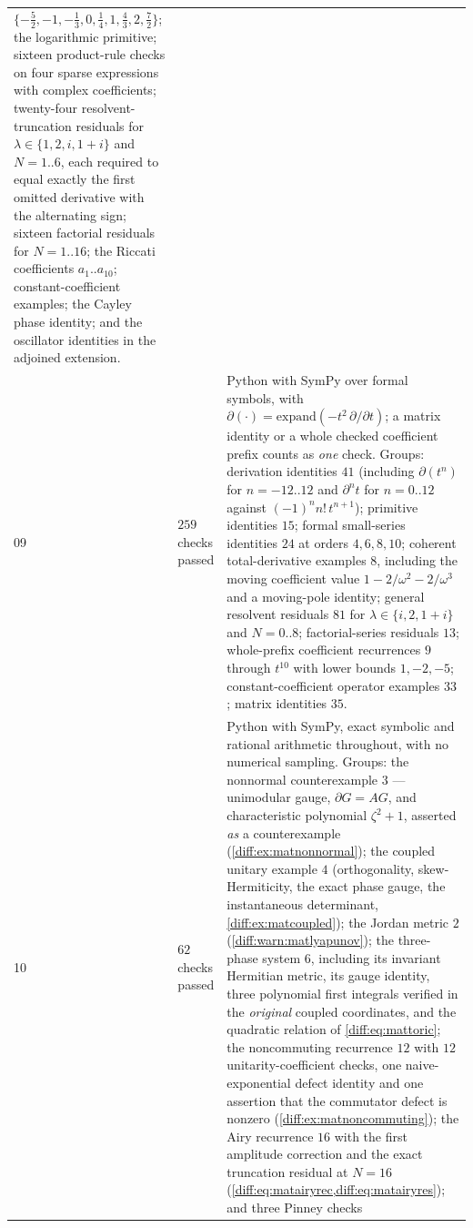 \documentclass[11pt,letterpaper]{article}
\numberwithin{equation}{section}
\theoremstyle{definition}
\theoremstyle{remark}
\newcommand{\der}{\partial}
\begin{document}
\begin{longtable}{@{}L{0.09\textwidth}L{0.13\textwidth}L{0.70\textwidth}@{}}
$\{-\tfrac52,-1,-\tfrac13,0,\tfrac14,1,\tfrac43,2,\tfrac72\}$; the
logarithmic primitive; sixteen product-rule checks on four sparse
expressions with complex coefficients; twenty-four resolvent-truncation
residuals for $\lambda\in\{1,2,i,1+i\}$ and $N=1..6$, each required to equal
exactly the first omitted derivative with the alternating sign; sixteen
factorial residuals for $N=1..16$; the Riccati coefficients $a_{1}..a_{10}$;
constant-coefficient examples; the Cayley phase identity; and the oscillator
identities in the adjoined extension. \\[0.3em]
09 & $259$ checks passed &
Python with SymPy over formal symbols, with
$\der(\cdot)=\mathrm{expand}(-t^{2}\,\partial/\partial t)$; a matrix identity
or a whole checked coefficient prefix counts as \emph{one} check. Groups:
derivation identities $41$ (including $\der(t^{n})$ for $n=-12..12$ and
$\der^{n}t$ for $n=0..12$ against $(-1)^{n}n!\,t^{n+1}$); primitive
identities $15$; formal small-series identities $24$ at orders
$4,6,8,10$; coherent total-derivative examples $8$, including the moving
coefficient value $1-2/\omega^{2}-2/\omega^{3}$ and a moving-pole identity;
general resolvent residuals $81$ for $\lambda\in\{i,2,1+i\}$ and $N=0..8$;
factorial-series residuals $13$; whole-prefix coefficient recurrences $9$
through $t^{10}$ with lower bounds $1,-2,-5$; constant-coefficient operator
examples $33$; matrix identities $35$. \\[0.3em]
10 & $62$ checks passed &
Python with SymPy, exact symbolic and rational arithmetic throughout, with no
numerical sampling. Groups: the nonnormal counterexample $3$ --- unimodular
gauge, $\der G=AG$, and characteristic polynomial $\zeta^{2}+1$, asserted
\emph{as} a counterexample (\cref{diff:ex:matnonnormal}); the coupled unitary
example $4$ (orthogonality, skew-Hermiticity, the exact phase gauge, the
instantaneous determinant, \cref{diff:ex:matcoupled}); the Jordan metric $2$
(\cref{diff:warn:matlyapunov}); the three-phase system $6$, including its
invariant Hermitian metric, its gauge identity, three polynomial first
integrals verified in the \emph{original} coupled coordinates, and the
quadratic relation of \cref{diff:eq:mattoric}; the noncommuting recurrence
$12$ with $12$ unitarity-coefficient checks, one naive-exponential defect
identity and one assertion that the commutator defect is nonzero
(\cref{diff:ex:matnoncommuting}); the Airy recurrence $16$ with the first
amplitude correction and the exact truncation residual at $N=16$
(\cref{diff:eq:matairyrec,diff:eq:matairyres}); and three Pinney checks

\end{longtable}
\end{document}
